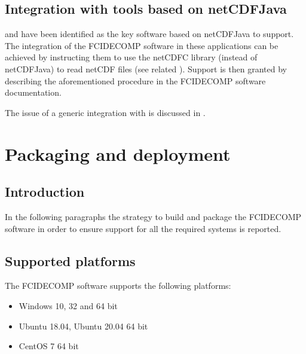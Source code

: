 \documentclass[a4paper,10pt,english]{sphinxmanual}
\begin{document}
\section{Integration with tools based on netCDF\sphinxhyphen{}Java}
\label{\detokenize{support_to_usage_patterns:integration-with-tools-based-on-netcdf-java}}\label{\detokenize{support_to_usage_patterns:integration-with-netcdf-java}}
\sphinxAtStartPar
{\hyperref[\detokenize{introduction:panoply}]{}} and {\hyperref[\detokenize{introduction:hdfview}]{}} have been identified as the key software based on netCDF\sphinxhyphen{}Java
to support. The integration of the FCIDECOMP software in these applications can be achieved by instructing them
to use the netCDF\sphinxhyphen{}C library (instead of netCDF\sphinxhyphen{}Java) to read netCDF files
(see related {\hyperref[\detokenize{introduction:netcdf-java-github}]{}}). Support is then granted by describing the aforementioned
procedure in the FCIDECOMP software documentation.

\sphinxAtStartPar
The issue of a generic integration with {\hyperref[\detokenize{introduction:netcdf-java}]{}} is discussed in
{\hyperref[\detokenize{a_design_justifications:design-justifications}]{}}.


\chapter{Packaging and deployment}
\label{\detokenize{packaging_and_deployment:packaging-and-deployment}}\label{\detokenize{packaging_and_deployment::doc}}

\section{Introduction}
\label{\detokenize{packaging_and_deployment:introduction}}
\sphinxAtStartPar
In the following paragraphs the strategy to build and package the FCIDECOMP software in order to ensure
support for all the required systems is reported.


\section{Supported platforms}
\label{\detokenize{packaging_and_deployment:supported-platforms}}\label{\detokenize{packaging_and_deployment:id1}}
\sphinxAtStartPar
The FCIDECOMP software supports the following platforms:
\begin{itemize}
\item {} 
\sphinxAtStartPar
Windows 10, 32 and 64 bit

\item {} 
\sphinxAtStartPar
Ubuntu 18.04, Ubuntu 20.04 64 bit

\item {} 
\sphinxAtStartPar
CentOS 7 64 bit

\end{itemize}
\end{document}
